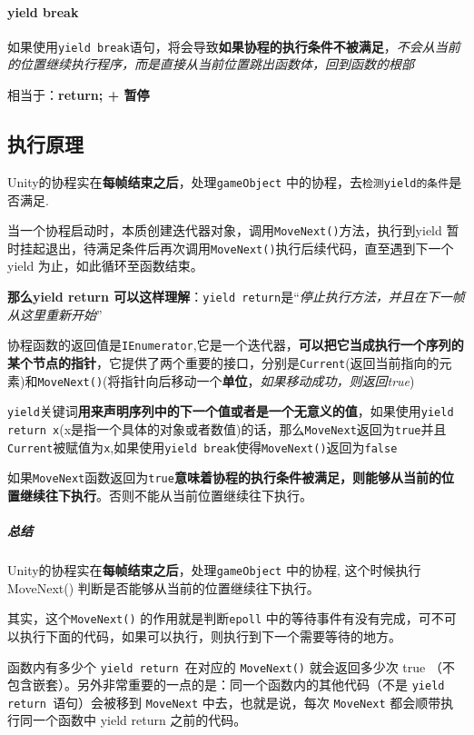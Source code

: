 \documentclass[UTF8,a4paper,12pt]{ctexbook}
\begin{document}
			\paragraph{yield break}
				如果使用\verb|yield break|语句，将会导致\textbf{如果协程的执行条件不被满足}，\textit{不会从当前的位置继续执行程序，而是直接从当前位置跳出函数体，回到函数的根部}
				
				\color{blue}相当于：\textbf{return; + 暂停}\color{black}
				
		\subsection{执行原理}
			Unity的协程实在\textbf{每帧结束之后}，处理\verb|gameObject| 中的协程，去\verb|检测yield的条件|是否满足.
		
			当一个协程启动时，本质创建迭代器对象，调用\verb|MoveNext()|方法，执行到yield 暂时挂起退出，待满足条件后再次调用\verb|MoveNext()|执行后续代码，直至遇到下一个yield 为止，如此循环至函数结束。
			
			\textbf{那么yield return 可以这样理解}：\verb|yield return|是“\textit{停止执行方法，并且在下一帧从这里重新开始}”
			
			协程函数的返回值是\verb|IEnumerator|,它是一个迭代器，\textbf{可以把它当成执行一个序列的某个节点的指针}，它提供了两个重要的接口，分别是\verb|Current|(返回当前指向的元素)和\verb|MoveNext()|(将指针向后移动一个\textbf{单位}，\textit{如果移动成功，则返回true})
			
			\verb|yield|关键词\textbf{用来声明序列中的下一个值或者是一个无意义的值}，如果使用\verb|yield return x|(x是指一个具体的对象或者数值)的话，那么\verb|MoveNext|返回为\verb|true|并且\verb|Current|被赋值为\verb|x|,如果使用\verb|yield break|使得\verb|MoveNext()|返回为\verb|false|
			
			如果\verb|MoveNext|函数返回为\verb|true|\textbf{意味着协程的执行条件被满足，则能够从当前的位置继续往下执行}。否则不能从当前位置继续往下执行。	
			
			

			\subparagraph{总结}
				Unity的协程实在\textbf{每帧结束之后}，处理\verb|gameObject| 中的协程, 这个时候执行MoveNext() 判断是否能够从当前的位置继续往下执行。
				
				其实，这个\verb|MoveNext()| 的作用就是判断\verb|epoll| 中的等待事件有没有完成，可不可以执行下面的代码，如果可以执行，则执行到下一个需要等待的地方。
			
				函数内有多少个 \verb|yield return |在对应的 \verb|MoveNext()| 就会返回多少次 true （不包含嵌套）。另外非常重要的一点的是：同一个函数内的其他代码（不是 \verb|yield return |语句）会被移到 \verb|MoveNext| 中去，也就是说，每次 \verb|MoveNext| 都会顺带执行同一个函数中 yield return 之前的代码。
				
\end{document}
